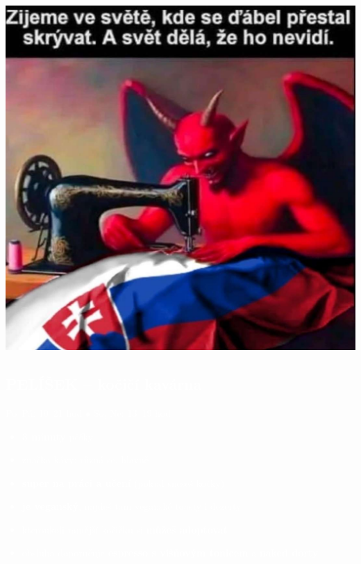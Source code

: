 \documentclass{article}
\begin{document}
\begin{yellowbox}
  \begin{minipage}{0.27\textwidth}
    \includegraphics[width=\linewidth]{dulezite.jpg}
  \end{minipage}
  \hfill
  \begin{minipage}{0.7\textwidth}
    \vspace{-5pt}
    \textcolor{white}{
    \subsection*{PELÍŠEK -- kočičí kavárna}
    Po--Pá: 10--21 hod $\bullet$ So, Ne: 13--19 hod
    \small
    \begin{itemize}[leftmargin=10pt]
      \item \textbf{3 minuty} pěšky
      \item značka kávy: různá se, hlavně 
      \item \textbf{super na práci a učení} (pokud sneseš kočky)
      \item \textbf{je veganský}, najdeš tam veganské toasty i dezerty
      \item kteroukoli tamější kočičku si \textbf{můžeš adoptovat}
      \item obsluha doporučuje \textbf{espresso s višňovým tonicem} a \textbf{naked dorty}
    \end{itemize}
    }
  \end{minipage}
\end{yellowbox}
\end{document}
